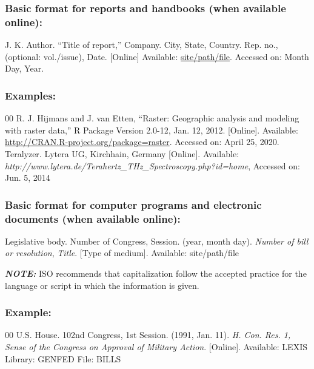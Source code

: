\documentclass{IEEEoj}
\begin{document}
\subsubsection*{Basic format for reports and handbooks (when available online): }

J. K. Author. ``Title of report,'' Company. City, State, Country. Rep. no.,
(optional: vol./issue), Date. [Online] Available:
\underline{site/path/file}. Accessed
on: Month Day, Year.

\subsubsection*{Examples:}

\begin{thebibliography}{00}
 R. J. Hijmans and J. van Etten, ``Raster: Geographic analysis and modeling with raster data,'' R Package Version 2.0-12, Jan. 12, 2012. [Online]. Available: \underline {http://CRAN.R-project.org/package=raster}. Accessed on: April 25, 2020.
 Teralyzer. Lytera UG, Kirchhain, Germany [Online]. Available: \emph{http://www.lytera.de/Terahertz\_THz\_Spectroscopy.php?id=home}, Accessed on: Jun. 5, 2014
\end{thebibliography}

\subsubsection*{Basic format for computer programs and electronic documents (when available online): }

Legislative body. Number of Congress, Session. (year, month day). \textit{Number of bill or resolution}, \textit{Title}. [Type
of medium]. Available: {site/path/file}

{\bfseries\itshape NOTE:} ISO recommends that capitalization follow the
accepted practice for the language or script in which the information is
given.

\subsubsection*{Example:}

\begin{thebibliography}{00}
 U.S. House. 102nd Congress, 1st Session. (1991, Jan. 11). \textit{H. Con. Res. 1, Sense of the Congress on Approval of Military Action}. [Online]. Available: LEXIS Library: GENFED File: BILLS
\end{thebibliography}
\end{document}
